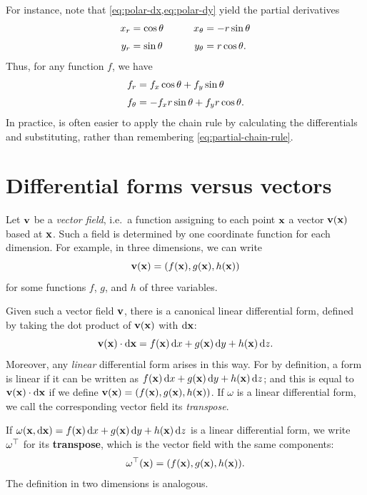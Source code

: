 \documentclass[12pt]{amsart}
\begin{document}
For instance, note that \cref{eq:polar-dx,eq:polar-dy} yield the partial derivatives
\begin{alignat*}{2}
  {x}_{r} &= \cos\theta &\qquad
  {x}_{\theta} &= -r\sin\theta\\[3pt]
  {y}_{r} &= \sin\theta &\quad
  {y}_{\theta} &= r\cos\theta.
\end{alignat*}
Thus, for any function $f$, we have
\begin{align*}
  \pder{f}{r} %
  &= \pder{f}{x} \cos\theta + \pder{f}{y} \sin\theta\\[3pt]
  \pder{f}{\theta} %
  &= -\pder{f}{x} r\sin\theta + \pder{f}{y} r \cos \theta.
\end{align*}
In practice, is often easier to apply the chain rule by calculating the differentials and substituting, rather than remembering \cref{eq:partial-chain-rule}.


\section{Differential forms versus vectors}
\label{sec:forms-vs-vectors}

Let $\mathbf{v}$ be a \emph{vector field}, i.e.\ a function assigning to each point $\mathbf{x}$ a vector $\mathbf{v}(\mathbf{x})$ based at $\mathbf{x}$.
Such a field is determined by one coordinate function for each dimension.
For example, in three dimensions, we can write
\[ \mathbf{v}(\mathbf{x}) = (f(\mathbf{x}),g(\mathbf{x}),h(\mathbf{x})) \]
for some functions $f$, $g$, and $h$ of three variables.

Given such a vector field $\mathbf{v}$, there is a canonical linear differential form, defined by taking the dot product of $\mathbf{v}(\mathbf{x})$ with ${\mathrm{d} \mathbf{x}}$:
\[ \mathbf{v}(\mathbf{x}) \cdot {\ensuremath{\mathrm{d} \mathbf{x}}} = f(\mathbf{x})\,{\mathrm{d} x} + g(\mathbf{x})\,{\mathrm{d} y} + h(\mathbf{x})\,{\mathrm{d} z}. \]
Moreover, any \emph{linear} differential form arises in this way.
For by definition, a form is linear if it can be written as $f(\mathbf{x})\,{\mathrm{d} x} + g(\mathbf{x})\,{\mathrm{d} y} + h(\mathbf{x})\,{\mathrm{d} z}$; and this is equal to $\mathbf{v}(\mathbf{x}) \cdot {\ensuremath{\mathrm{d} \mathbf{x}}}$ if we define $\mathbf{v}(\mathbf{x}) = (f(\mathbf{x}),g(\mathbf{x}),h(\mathbf{x}))$.
If $\omega$ is a linear differential form, we call the corresponding vector field its \emph{transpose}.

\begin{defn}
  If $\omega(\mathbf{x},{\mathrm{d} \mathbf{x}}) = f(\mathbf{x})\,{\mathrm{d} x} + g(\mathbf{x})\,{\mathrm{d} y} + h(\mathbf{x})\,{\mathrm{d} z}$ is a linear differential form, we write ${\omega}^\top$ for its \textbf{transpose}, which is the vector field with the same components:
  \[ {\omega}^\top(\mathbf{x}) = (f(\mathbf{x}), g(\mathbf{x}), h(\mathbf{x})). \]
  The definition in two dimensions is analogous.
\end{defn}
\end{document}
